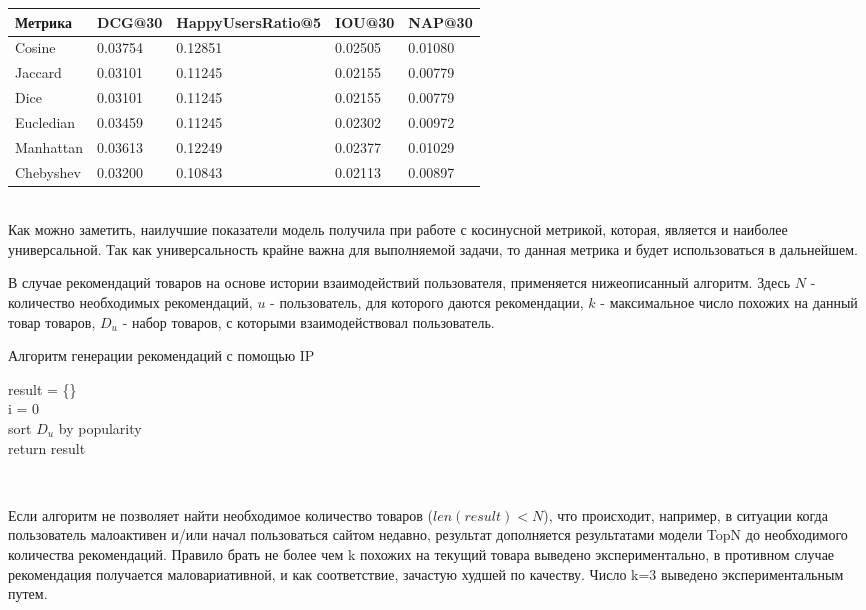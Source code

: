 \documentclass[14pt]{mmcs_article}
\begin{document}
\begin{tabular}{| l |l| l| l| l|}
	\hline
	Метрика & DCG@30 & HappyUsersRatio@5 & IOU@30 &  NAP@30 \\
	\hline
	Cosine & 0.03754 & 0.12851 & 0.02505 & 0.01080 \\
	\hline
	Jaccard &  0.03101 &0.11245 & 0.02155 & 0.00779\\
	\hline
	Dice & 0.03101 & 0.11245 & 0.02155 & 0.00779 \\
	\hline
	Eucledian & 0.03459 & 0.11245 & 0.02302 & 0.00972 \\
	\hline
	Manhattan & 0.03613 & 0.12249 & 0.02377 & 0.01029 \\
	\hline
	Chebyshev & 0.03200 & 0.10843 & 0.02113 & 0.00897 \\
	\hline

\end{tabular}\\
Как можно заметить, наилучшие показатели модель получила при работе с косинусной метрикой, которая, является и наиболее универсальной. Так как универсальность крайне важна для выполняемой задачи, то данная метрика и будет использоваться в дальнейшем.
 
В случае рекомендаций товаров на основе истории взаимодействий пользователя, применяется нижеописанный алгоритм. Здесь $N$ - количество необходимых рекомендаций, $u$ - пользователь, для которого даются рекомендации, $k$ - максимальное число похожих на данный товар товаров, $D_u$ - набор товаров, с которыми взаимодействовал пользователь.   \\
\begin{algorithm}[H]\label{IP:1}
	\caption{Алгоритм генерации рекомендаций с помощью IP}
	result = \{\} \\
	i = 0 \\
	sort $D_u$ by popularity\\
	return result
\end{algorithm} 
\ 

Если алгоритм не позволяет найти необходимое количество товаров ($len(result) < N$), что происходит, например, в ситуации когда пользователь малоактивен и/или начал пользоваться сайтом недавно, результат дополняется результатами модели TopN до необходимого количества рекомендаций. 
Правило брать не более чем k похожих на текущий товара выведено экспериментально, в противном случае рекомендация получается маловариативной, и как соответствие, зачастую худшей по качеству. Число k=3 выведено экспериментальным путем. 
\end{document}
